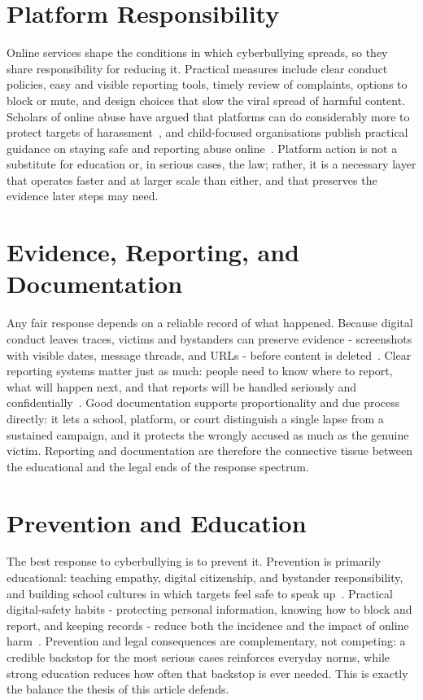\documentclass[11pt,a4paper]{report}
\begin{document}
\chapter{Platform Responsibility}
Online services shape the conditions in which cyberbullying spreads, so they
share responsibility for reducing it. Practical measures include clear conduct
policies, easy and visible reporting tools, timely review of complaints,
options to block or mute, and design choices that slow the viral spread of
harmful content. Scholars of online abuse have argued that platforms can do
considerably more to protect targets of harassment~\cite{citron2014}, and
child-focused organisations publish practical guidance on staying safe and
reporting abuse online~\cite{unicef2019}. Platform action is not a substitute
for education or, in serious cases, the law; rather, it is a necessary layer
that operates faster and at larger scale than either, and that preserves the
evidence later steps may need.

\chapter{Evidence, Reporting, and Documentation}
Any fair response depends on a reliable record of what happened. Because
digital conduct leaves traces, victims and bystanders can preserve evidence -
screenshots with visible dates, message threads, and URLs - before content is
deleted~\cite{hinduja2015}. Clear reporting systems matter just as much:
people need to know where to report, what will happen next, and that reports
will be handled seriously and confidentially~\cite{unicef2019}. Good
documentation supports proportionality and due process directly: it lets a
school, platform, or court distinguish a single lapse from a sustained
campaign, and it protects the wrongly accused as much as the genuine victim.
Reporting and documentation are therefore the connective tissue between the
educational and the legal ends of the response spectrum.

\chapter{Prevention and Education}
The best response to cyberbullying is to prevent it. Prevention is primarily
educational: teaching empathy, digital citizenship, and bystander
responsibility, and building school cultures in which targets feel safe to
speak up~\cite{hinduja2015}. Practical digital-safety habits - protecting
personal information, knowing how to block and report, and keeping records -
reduce both the incidence and the impact of online harm~\cite{unicef2019}.
Prevention and legal consequences are complementary, not competing: a credible
backstop for the most serious cases reinforces everyday norms, while strong
education reduces how often that backstop is ever needed. This is exactly the
balance the thesis of this article defends.
\end{document}
